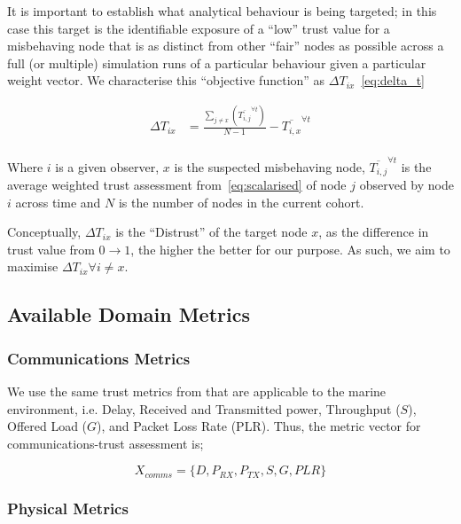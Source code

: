 \documentclass[conference]{IEEEtran}
\begin{document}
It is important to establish what analytical behaviour is being targeted; in this case this target is the identifiable exposure of a ``low'' trust value for a misbehaving node that is as distinct from other ``fair'' nodes as possible across a full (or multiple) simulation runs of a particular behaviour given a particular weight vector.
We characterise this ``objective function'' as $\Delta T_{ix}$~\eqref{eq:delta_t}

\begin{align}
  \Delta T_{ix} &= \frac{\sum_{j\neq x}\left( \overline{T_{i,j}}^{\forall t}\right)}{N-1} - \overline{T_{i,x}}^{\forall t} \label{eq:delta_t}\\
\end{align}

Where $i$ is a given observer, $x$ is the suspected misbehaving node, $\overline{T_{i,j}}^{\forall t}$ is the average weighted trust assessment from~\ref{eq:scalarised} of node $j$ observed by node $i$ across time and $N$ is the number of nodes in the current cohort.

Conceptually, $\Delta T_{ix}$ is the ``Distrust'' of the target node $x$, as the difference in trust value from $0\to1$, the higher the better for our purpose. 
As such, we aim to maximise $\Delta T_{ix}\forall i\neq x$.


\subsection{Available Domain Metrics}

\subsubsection{Communications Metrics}

We use the same trust metrics from \cite{Guo2012} that are applicable to the marine environment, i.e. Delay, Received and Transmitted power, Throughput ($S$), Offered Load ($G$), and Packet Loss Rate (PLR).
Thus, the metric vector for communications-trust assessment is;

\begin{equation}
  X_{comms}=\{D, P_{RX}, P_{TX}, S, G, PLR\}
	\label{eq:comms_vector}
\end{equation}

\subsubsection{Physical Metrics}
\end{document}

